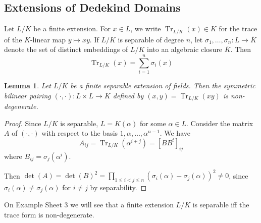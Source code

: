 \documentclass[11pt]{article}
\theoremstyle{definition}
\theoremstyle{plain}
\newtheorem{lemma}[definition]{Lemma}
\theoremstyle{remark}
\DeclareMathOperator{\Tr}{Tr}
\begin{document}
\subsection{Extensions of Dedekind Domains}

Let $L / K$ be a finite extension. For $x \in L$, we write $\Tr_{L/K}(x) \in K$ for the trace of the $K$-linear map $y \mapsto x y$. If $L/K$ is separable of degree $n$, let $\sigma_1, \ldots, \sigma_n : L \to \overline{K}$ denote the set of distinct embeddings of $L/K$ into an algebraic closure $\overline{K}$. Then
\begin{equation*}
    \Tr_{L/K}(x) = \sum_{i=1}^n \sigma_i(x)
\end{equation*}

\begin{lemma}\label{lem:10_1}
    Let $L / K$ be a finite separable extension of fields. Then the symmetric bilinear pairing $(\cdot, \cdot) : L \times L \to K$ defined by $(x, y) = \Tr_{L/K}(xy)$ is non-degenerate.
\end{lemma}
\begin{proof}
    Since $L/K$ is separable, $L = K(\alpha)$ for some $\alpha \in L$. Consider the matrix $A$ of $(\cdot, \cdot)$ with respect to the basis $1, \alpha, \ldots, \alpha^{n-1}$. We have
    \begin{equation*}
        A_{ij} = \Tr_{L/K}(\alpha^{i+j}) = [B B^t]_{ij}
    \end{equation*}
    where $B_{ij} = \sigma_j(\alpha^i)$.

    Then $\det(A) = \det(B)^2 = \prod_{1 \le i < j \le n} (\sigma_i(\alpha) - \sigma_j(\alpha))^2 \neq 0$, since $\sigma_i(\alpha) \neq \sigma_j(\alpha)$ for $i \neq j$ by separability.
\end{proof}

On Example Sheet 3 we will see that a finite extension $L/K$ is separable iff the trace form is non-degenerate.
\end{document}
